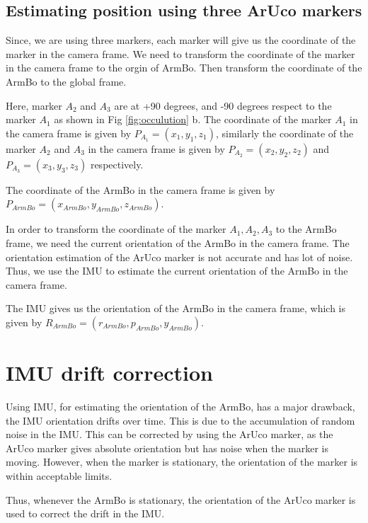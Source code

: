 \documentclass[12pt, twoside]{report}
\begin{document}
\subsection{Estimating position using three ArUco markers}
Since, we are using three markers, each marker will give us the coordinate
of the marker in the camera frame. We need to transform the coordinate of the
marker in the camera frame to the orgin of ArmBo. Then transform the coordinate
of the ArmBo to the global frame.

Here, marker $A_2$ and $A_3$ are at +90 degrees, and -90 degrees respect to the
marker $A_1$ as shown in Fig \ref{fig:occulution} b. The coordinate of the marker
$A_1$ in the camera frame is given by $P_{A_1} = (x_1, y_1, z_1)$, similarly the
coordinate of the marker $A_2$ and $A_3$ in the camera frame is given by
$P_{A_2} = (x_2, y_2, z_2)$ and $P_{A_3} = (x_3, y_3, z_3)$ respectively.

The coordinate of the ArmBo in the camera frame is given by $P_{ArmBo} = (x_{ArmBo}, y_{ArmBo}, z_{ArmBo})$.

In order to transform the coordinate of the marker $A_1, A_2, A_3$ to the ArmBo frame,
we need the current orientation of the ArmBo in the camera frame. The orientation estimation
of the ArUco marker is not accurate and has lot of noise. Thus, we use the IMU to estimate the
current orientation of the ArmBo in the camera frame.

The IMU gives us the orientation of the ArmBo in the camera frame,
which is given by $R_{ArmBo} = (r_{ArmBo}, p_{ArmBo}, y_{ArmBo})$.


\section{IMU drift correction}

Using IMU, for estimating the orientation of the ArmBo, has a major drawback,
the IMU orientation drifts over time. This is due to the accumulation of random noise
in the IMU. This can be corrected by using the ArUco marker, as the ArUco marker
gives absolute orientation but has noise when the marker is moving. However,
when the marker is stationary, the orientation of the marker is within acceptable limits.

Thus, whenever the ArmBo is stationary, the orientation of the ArUco marker is used
to correct the drift in the IMU.
\end{document}
